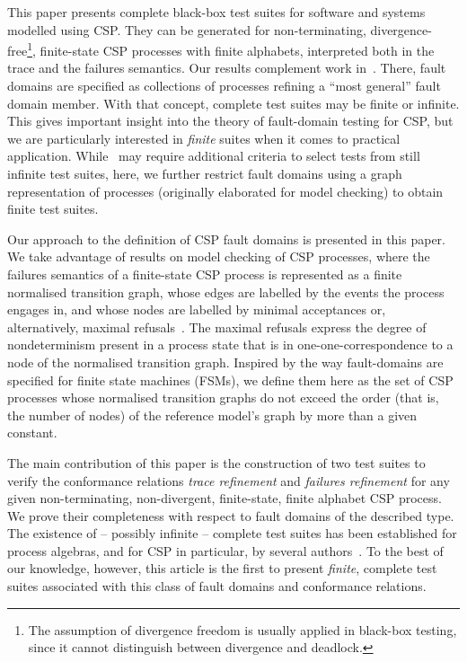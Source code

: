 This paper presents complete black-box test suites for software and systems
modelled using CSP. They can be generated for non-terminating, 
divergence-free\footnote{The
assumption of divergence freedom is usually applied in black-box testing,
since it cannot distinguish between divergence and deadlock.}, finite-state
CSP processes with finite alphabets, interpreted both in the trace and the
failures semantics. Our results complement work
in~\cite{DBLP:conf/pts/CavalcantiS17}. There, fault domains are specified as
collections of processes refining a ``most general'' fault domain member.
With that concept, complete test suites may be finite or infinite. This gives
important insight into the theory of fault-domain testing for CSP, but we are
particularly interested in {\it finite} suites when it comes to practical
application. While~\cite{DBLP:conf/pts/CavalcantiS17} may require additional
criteria to select tests from still infinite test suites, here, we further
restrict fault domains using a graph representation of processes (originally
elaborated for model checking) to obtain finite test suites. 

Our approach to the definition of CSP fault domains is presented in this
paper. We take advantage of results on model checking of CSP
processes, where the failures semantics of a finite-state CSP process is
represented as a finite normalised transition graph, whose edges are labelled
by the events the process engages in, and whose nodes are labelled by minimal
acceptances or, alternatively, maximal
refusals~\cite{Roscoe:1994:chapter}. The maximal refusals express the
degree of nondeterminism present in a process state that is in
one-one-correspondence to a node of the normalised transition graph. Inspired
by the way fault-domains are specified for finite state machines (FSMs),
we define them here as the set of CSP processes whose normalised transition
graphs do not exceed the order (that is, the number of nodes) of the
reference model's graph by more than a given constant.

The main contribution of this paper is the construction of two test suites to
verify the conformance relations \emph{trace refinement} and \emph{failures
refinement} for any given non-terminating, 
non-divergent, finite-state, finite alphabet CSP
process. We prove their completeness with respect to fault domains
of the described type.  The existence of -- possibly infinite -- complete
test suites has been established for process algebras, and for CSP in
particular, by several
authors~\cite{Hennessy:1988:ATP:50497,Schneider:1995:OST:203471.203475,DBLP:conf/fm/PeleskaS96,peleska1997a,DBLP:conf/icfem/CavalcantiG07,DBLP:conf/pts/CavalcantiS17}.
To the best of our knowledge, however, this article is the first to present
{\it finite}, complete test suites associated with this class of fault
domains and conformance relations.


